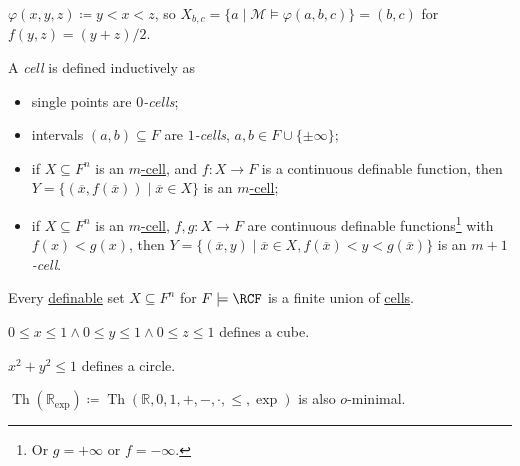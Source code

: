 \begin{eg}
	\(\varphi (x, y, z) \coloneqq y < x < z\), so \(X_{b, c} = \{ a \mid \mathcal{M} \models \varphi (a, b, c) \} = (b, c)\) for \(f(y, z) = (y + z) / 2\).
\end{eg}

\begin{definition}[Cell]\label{def:cell}
	A \emph{cell} is defined inductively as
	\begin{itemize}
		\item single points are \emph{\(0\)-cells};
		\item intervals \((a, b) \subseteq F\) are \emph{\(1\)-cells}, \(a, b \in F \cup \{ \pm \infty \} \);
		\item if \(X \subseteq F^n\) is an \hyperref[def:cell]{\(m\)-cell}, and \(f \colon X \to F\) is a continuous definable function, then \(Y = \{ (\overline{x} , f(\overline{x} )) \mid \overline{x} \in X \} \) is an \hyperref[def:cell]{\(m\)-cell};
		\item if \(X \subseteq F^n\) is an \hyperref[def:cell]{\(m\)-cell}, \(f, g \colon X \to F\)  are continuous definable functions\footnote{Or \(g = +\infty \) or \(f = -\infty \).} with \(f(x) < g(x)\), then \(Y = \{ (\overline{x} , y) \mid \overline{x} \in X, f(\overline{x} ) < y < g(\overline{x} )\} \) is an \emph{\(m+1\)-cell}.
	\end{itemize}
\end{definition}

\begin{center}
\end{center}

\begin{theorem}
	Every \hyperref[def:definable]{definable} set \(X \subseteq F^n\) for \(F \models \RCF\) is a finite union of \hyperref[def:cell]{cells}.
\end{theorem}

\begin{eg}
	\(0 \leq x \leq 1 \land 0 \leq y \leq 1 \land 0 \leq z \leq 1\) defines a cube.
\end{eg}

\begin{eg}
	\(x^2 + y^2 \leq 1\) defines a circle.
\end{eg}

\begin{remark}
	\(\mathop{\mathrm{Th}}(\mathbb{R} _{\exp }) \coloneqq \mathop{\mathrm{Th}}(\mathbb{R} , 0, 1, +, -, \cdot, \leq , \exp ) \) is also \(o\)-minimal.
\end{remark}

